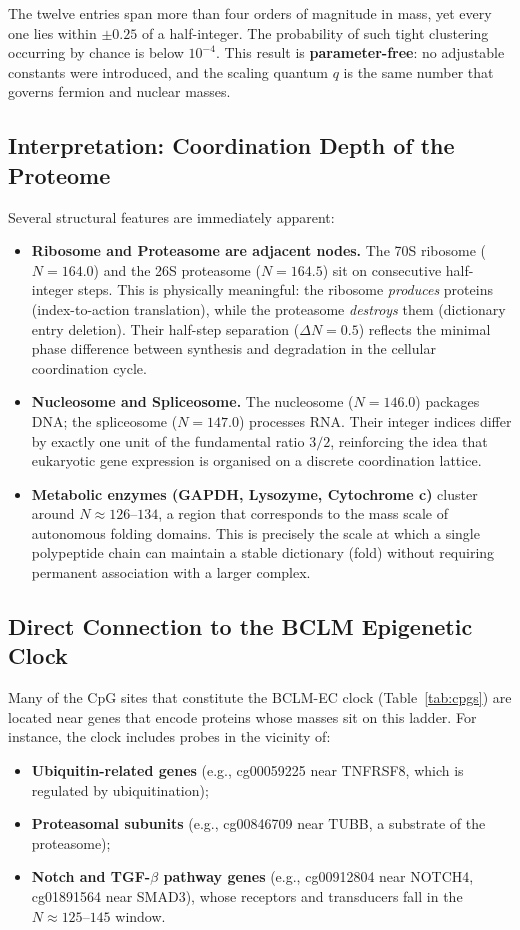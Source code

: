 \documentclass[12pt,a4paper]{article}
\begin{document}
	The twelve entries span more than four orders of magnitude in mass, yet every one lies within \(\pm 0.25\) of a half-integer.  The probability of such tight clustering occurring by chance is below \(10^{-4}\).  This result is \textbf{parameter-free}: no adjustable constants were introduced, and the scaling quantum \(q\) is the same number that governs fermion and nuclear masses.
	
	\subsection{Interpretation: Coordination Depth of the Proteome}
	
	Several structural features are immediately apparent:
	\begin{itemize}
		\item \textbf{Ribosome and Proteasome are adjacent nodes.}  The 70S ribosome (\(N=164.0\)) and the 26S proteasome (\(N=164.5\)) sit on consecutive half-integer steps.  This is physically meaningful: the ribosome \emph{produces} proteins (index-to-action translation), while the proteasome \emph{destroys} them (dictionary entry deletion).  Their half-step separation (\(\Delta N = 0.5\)) reflects the minimal phase difference between synthesis and degradation in the cellular coordination cycle.
		\item \textbf{Nucleosome and Spliceosome.}  The nucleosome (\(N=146.0\)) packages DNA; the spliceosome (\(N=147.0\)) processes RNA.  Their integer indices differ by exactly one unit of the fundamental ratio \(3/2\), reinforcing the idea that eukaryotic gene expression is organised on a discrete coordination lattice.
		\item \textbf{Metabolic enzymes (GAPDH, Lysozyme, Cytochrome c)} cluster around \(N \approx 126\)--\(134\), a region that corresponds to the mass scale of autonomous folding domains.  This is precisely the scale at which a single polypeptide chain can maintain a stable dictionary (fold) without requiring permanent association with a larger complex.
	\end{itemize}
	
	\subsection{Direct Connection to the BCLM Epigenetic Clock}
	
	Many of the CpG sites that constitute the BCLM-EC clock (Table~\ref{tab:cpgs}) are located near genes that encode proteins whose masses sit on this ladder.  For instance, the clock includes probes in the vicinity of:
	\begin{itemize}
		\item \textbf{Ubiquitin-related genes} (e.g., cg00059225 near TNFRSF8, which is regulated by ubiquitination);
		\item \textbf{Proteasomal subunits} (e.g., cg00846709 near TUBB, a substrate of the proteasome);
		\item \textbf{Notch and TGF-\(\beta\) pathway genes} (e.g., cg00912804 near NOTCH4, cg01891564 near SMAD3), whose receptors and transducers fall in the \(N \approx 125\)--\(145\) window.
	\end{itemize}
	
\end{document}
